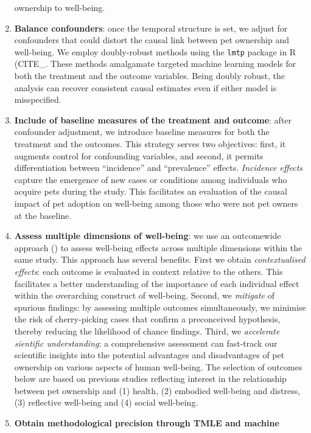 \documentclass[
  singlecolumn,
  9pt]{article}
\begin{document}
\begin{enumerate}
  ownership to well-being.
\item
  \textbf{Balance confounders}: once the temporal structure is set, we
  adjust for confounders that could distort the causal link between pet
  ownership and well-being. We employ doubly-robust methods using the
  \texttt{lmtp} package in R (CITE\_. These methods amalgamate targeted
  machine learning models for both the treatment and the outcome
  variables. Being doubly robust, the analysis can recover consistent
  causal estimates even if either model is misspecified.
\item
  \textbf{Include of baseline measures of the treatment and outcome}:
  after confounder adjustment, we introduce baseline measures for both
  the treatment and the outcomes. This strategy serves two objectives:
  first, it augments control for confounding variables, and second, it
  permits differentiation between ``incidence'' and ``prevalence''
  effects. \emph{Incidence effects} capture the emergence of new cases
  or conditions among individuals who acquire pets during the study.
  This facilitates an evaluation of the causal impact of pet adoption on
  well-being among those who were not pet owners at the baseline.
\item
  \textbf{Assess multiple dimensions of well-being}: we use an
  outcomewide approach () to assess well-being effects across multiple
  dimensions within the same study. This approach has several benefits.
  First we obtain \emph{contextualised effects}: each outcome is
  evaluated in context relative to the others. This facilitates a better
  understanding of the importance of each individual effect within the
  overarching construct of well-being. Second, we \emph{mitigate} of
  spurious findings: by assessing multiple outcomes simultaneously, we
  minimise the risk of cherry-picking cases that confirm a preconceived
  hypothesis, thereby reducing the likelihood of chance findings. Third,
  we \emph{accelerate sientific understanding}: a comprehensive
  assessment can fast-track our scientific insights into the potential
  advantages and disadvantages of pet ownership on various aspects of
  human well-being. The selection of outcomes below are based on
  previous studies reflecting interest in the relationship between pet
  ownership and (1) health, (2) embodied well-being and distress, (3)
  reflective well-being and (4) social well-being.
\item
  \textbf{Obtain methodological precision through TMLE and machine
}
\end{enumerate}
\end{document}
